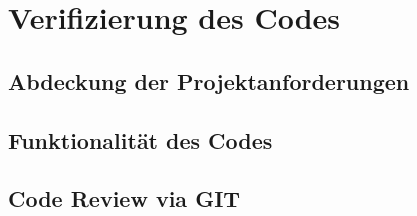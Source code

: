 \section{Verifizierung des Codes}\label{section:test}

\subsection{Abdeckung der Projektanforderungen}

\subsection{Funktionalität des Codes}

\subsection{Code Review via GIT}
